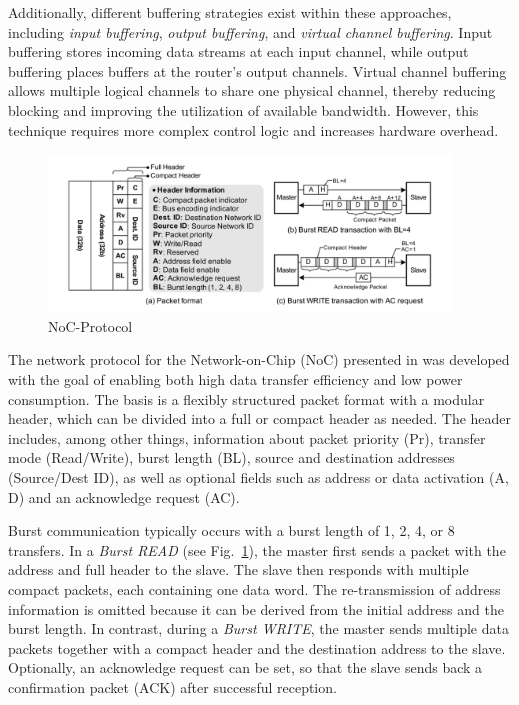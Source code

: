 Additionally, different buffering strategies exist within these approaches, including \textit{input buffering}, \textit{output buffering}, and \textit{virtual channel buffering}. Input buffering stores incoming data streams at each input channel, while output buffering places buffers at the router’s output channels. Virtual channel buffering allows multiple logical channels to share one physical channel, thereby reducing blocking and improving the utilization of available bandwidth. However, this technique requires more complex control logic and increases hardware overhead.

\begin{figure}[htbp]
    \centering
    \includegraphics[width=0.95\textwidth]{img/NoC Protocol.png}
    \caption{NoC-Protocol~\cite{lee_low-power_2006}}\label{fig:NOC_Protocol}
\end{figure}

The network protocol for the Network-on-Chip (NoC) presented in \cite{lee_low-power_2006} was developed with the goal of enabling both high data transfer efficiency and low power consumption. The basis is a flexibly structured packet format with a modular header, which can be divided into a full or compact header as needed. The header includes, among other things, information about packet priority (Pr), transfer mode (Read/Write), burst length (BL), source and destination addresses (Source/Dest ID), as well as optional fields such as address or data activation (A, D) and an acknowledge request (AC).

Burst communication typically occurs with a burst length of 1, 2, 4, or 8 transfers. In a \emph{Burst READ} (see Fig.~\ref{fig:NOC_Protocol}), the master first sends a packet with the address and full header to the slave. The slave then responds with multiple compact packets, each containing one data word. The re-transmission of address information is omitted because it can be derived from the initial address and the burst length. In contrast, during a \emph{Burst WRITE}, the master sends multiple data packets together with a compact header and the destination address to the slave. Optionally, an acknowledge request can be set, so that the slave sends back a confirmation packet (ACK) after successful reception.

